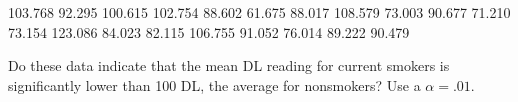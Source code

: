 \documentclass{article}
\begin{document}
\begin{enumerate}
	103.768 92.295 100.615 102.754 88.602 61.675 88.017 108.579 73.003 90.677 71.210 73.154 123.086 84.023 82.115 106.755 91.052 76.014 89.222 90.479

	Do these data indicate that the mean DL reading for current smokers is signiﬁcantly lower than 100 DL, the average for nonsmokers? Use a $\alpha=.01$.

\end{enumerate}
\end{document}
